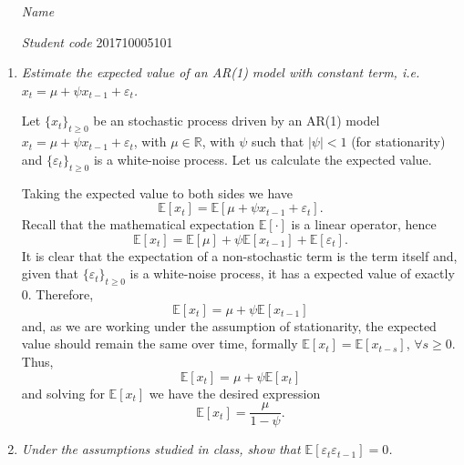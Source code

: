 \documentclass[fleqn]{article}
\newcommand{\E}[1]{\mathbb{E}\left[#1 \right]}
\begin{document}
 \vspace{0.3cm}
   \begin{itemize}[leftmargin=6.25cm, labelsep=0.5cm]

     \item[\textit{Name}] \scalebox{1.2}{David Plazas Escudero} %
     \item[\textit{Student code}] 201710005101 %

   \end{itemize}
\vspace{0.3cm}

\begin{enumerate}
\item \textit{Estimate the expected value of an AR(1) model with constant term, i.e. $x_t=\mu + \psi x_{t-1}+\varepsilon_t$.}

Let $\{x_t\}_{t\geq0}$ be an stochastic process driven by an AR(1) model $x_t=\mu + \psi x_{t-1}+\varepsilon_t$, with $\mu\in\mathbb{R}$, with $\psi$ such that $|\psi|<1$ (for stationarity) and $\{\varepsilon_t\}_{t\geq0}$ is a white-noise process. Let us calculate the expected value.

Taking the expected value to both sides we have
\[
\E{x_t}=\E{\mu+\psi x_{t-1}+\varepsilon_t}.
\]
Recall that the mathematical expectation $\E{\cdot}$ is a linear operator, hence
\[
\E{x_t}=\E{\mu}+\psi \E{x_{t-1}}+\E{\varepsilon_t}.
\]
It is clear that the expectation of a non-stochastic term is the term itself and, given that $\{\varepsilon_t\}_{t\geq0}$ is a white-noise process, it has a expected value of exactly 0. Therefore,
\[
\E{x_t}=\mu+\psi \E{x_{t-1}}
\]
and, as we are working under the assumption of stationarity, the expected value should remain the same over time, formally $\E{x_t}=\E{x_{t-s}}$, $\forall s\geq0$. Thus,
\[
\E{x_t}=\mu+\psi \E{x_t}
\]
and solving for $\E{x_t}$ we have the desired expression
\[
\E{x_t}=\dfrac{\mu}{1 - \psi}.
\]

\item \textit{Under the assumptions studied in class, show that $\E{\varepsilon_t\varepsilon_{t-1}}=0$.}


\end{enumerate}
\end{document}
